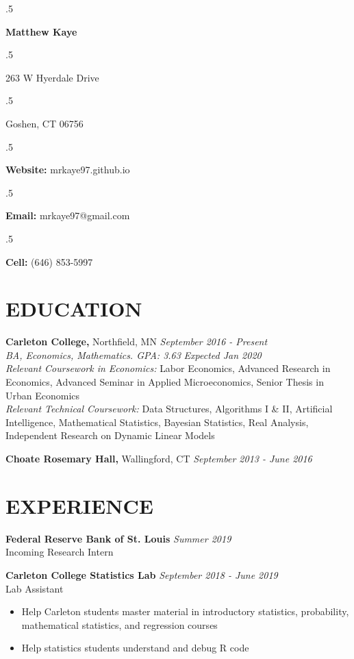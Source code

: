 \documentclass[margin, 9pt]{res} %
\begin{document}

\moveleft.5\hoffset\centerline{\large\bf Matthew Kaye} %
  
\moveleft.5\hoffset\centerline{263 W Hyerdale Drive}
\moveleft.5\hoffset\centerline{Goshen, CT 06756}
\medskip
\moveleft.5\hoffset\centerline{\textbf{Website:} mrkaye97.github.io}
\moveleft.5\hoffset\centerline{\textbf{Email:} mrkaye97@gmail.com} %
\moveleft.5\hoffset\centerline{\textbf{Cell:} (646) 853-5997}


\begin{resume}


\singlespacing
\section{EDUCATION}

{\sl} \textbf{Carleton College,} Northfield, MN \hfill \textit{September 2016 - Present}\smallskip\\
{\sl BA, Economics, Mathematics. GPA: 3.63} \hfill \textit{Expected Jan 2020}\smallskip\\
{\sl Relevant Coursework in Economics: } Labor Economics, Advanced Research in Economics, Advanced Seminar in Applied Microeconomics, Senior Thesis in Urban Economics\smallskip\\
{\sl Relevant Technical Coursework: } Data Structures, Algorithms I \& II, Artificial Intelligence, Mathematical Statistics, Bayesian Statistics, Real Analysis, Independent Research on Dynamic Linear Models

{\sl} \textbf{Choate Rosemary Hall,} Wallingford, CT \hfill \textit{September 2013 - June 2016}

\section{EXPERIENCE}
{\sl} \textbf{Federal Reserve Bank of St. Louis} \hfill \textit{Summer 2019}\smallskip\\
{\sl} Incoming Research Intern \smallskip


{\sl} \textbf{Carleton College Statistics Lab} \hfill \textit{September 2018 - June 2019}\\
{\sl} Lab Assistant \smallskip
{\sl} \begin{itemize}
\item Help Carleton students master material in introductory statistics, probability, mathematical statistics, and regression courses
\item Help statistics students understand and debug R code
\end{itemize}


\end{resume}
\end{document}
